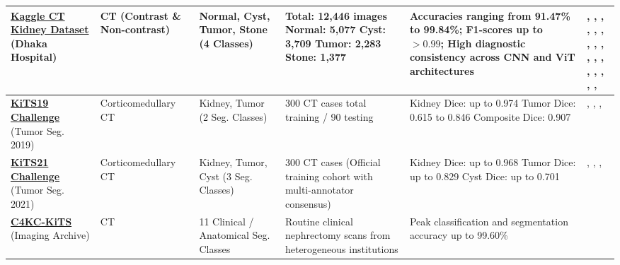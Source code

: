 \begin{longtable}{|L{2.8cm}|L{1.8cm}|L{2.5cm}|L{3.0cm}|L{3.6cm}|L{2.2cm}|}
\textbf{\href{https://www.kaggle.com/datasets/nazmul0087/ct-kidney-dataset-normal-cyst-tumor-and-stone}{Kaggle CT Kidney Dataset}} \newline (Dhaka Hospital) & CT (Contrast \& Non-contrast) & Normal, Cyst, Tumor, Stone (4 Classes) & Total: 12,446 images \newline Normal: 5,077 \newline Cyst: 3,709 \newline Tumor: 2,283 \newline Stone: 1,377 & Accuracies ranging from 91.47\% to 99.84\%; F1-scores up to $>0.99$; High diagnostic consistency across CNN and ViT architectures & \cite{khan2025multilevel}, \cite{verma2025automated}, \cite{rajendran2025kidney}, \cite{bhandari2023lightweight}, \cite{rathva2025ensemble}, \cite{tarul2025empirical}, \cite{pimpalkar2025fine}, \cite{alqahtani2025kidneynext}, \cite{islam2022vision}, \cite{sajid2026yolov8}, \cite{alebada2026hybrid}, \cite{hossain2024adaptive}, \cite{sharma2025hybrid}, \cite{martin2025evaluation}, \cite{ahmed2021ct}, \cite{tawfik2026pcsa}, \cite{hossain2025detection}, \cite{macin2025kidneynext} \\
\hline
\textbf{\href{https://github.com/neheller/kits19/tree/master/data}{KiTS19 Challenge}} \newline (Tumor Seg. 2019) & Corticomedullary CT & Kidney, Tumor (2 Seg. Classes) & 300 CT cases total  training / 90 testing & Kidney Dice: up to 0.974 \newline Tumor Dice: 0.615 to 0.846 \newline Composite Dice: 0.907 & \cite{ji2024asdnet}, \cite{abdelrahman2023efficientnet}, \cite{hatsutani2023protuberance}, \cite{xie2020seru} \\
\hline
\textbf{\href{https://github.com/neheller/kits21/tree/master/kits21/data}{KiTS21 Challenge}} \newline (Tumor Seg. 2021) & Corticomedullary CT & Kidney, Tumor, Cyst (3 Seg. Classes) & 300 CT cases (Official training cohort with multi-annotator consensus) & Kidney Dice: up to 0.968 \newline Tumor Dice: up to 0.829 \newline Cyst Dice: up to 0.701 & \cite{heller2023kits21}, \cite{gohil2024kidney}, \cite{zhao2023automatic}, \cite{chen20215d} \\
\hline
\textbf{\href{https://www.cancerimagingarchive.net/collection/c4kc-kits/}{C4KC-KiTS}} \newline (Imaging Archive) & CT & 11 Clinical / Anatomical Seg. Classes & Routine clinical nephrectomy scans from heterogeneous institutions & Peak classification and segmentation accuracy up to 99.60\% & \cite{sherryl2022ied} \\

\end{longtable}
